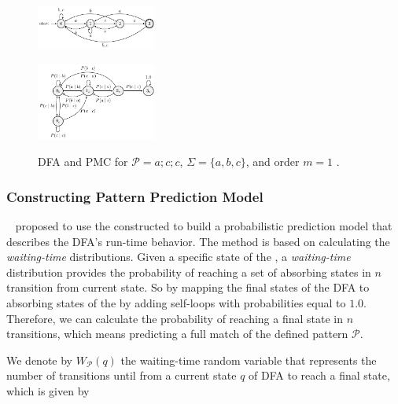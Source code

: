 \begin{figure}[!ht]
\begin{centering}

\includegraphics[width=0.35\textwidth]{./chapters/figures/forecasting/dfasr.pdf}
\label{fig:dfatcc}

\hfill

\includegraphics[width=0.35\textwidth]{./chapters/figures/forecasting/pmcr1.pdf}
\label{fig:mctcc1}

\caption{DFA and PMC for $\mathcal{P}=a ; c ; c$,  $\Sigma=\{a,b,c\}$, and order $m=1$  \cite{alevizos2017event}.}
\label{fig:dfa_mc_example}
\end{centering}
\end{figure}

\subsubsection*{Constructing Pattern Prediction Model}
\label{sec:pmc_prediction}

~\citet{alevizos2017event} proposed to use the constructed \pmcmr to build a probabilistic prediction model that describes the DFA's run-time behavior. The method is based on calculating the \textit{waiting-time} distributions. Given a specific state of the \pmcmr, a \textit{waiting-time} distribution provides the probability of reaching a set of absorbing states in $n$ transition from current state. So by mapping the final states of the DFA to absorbing states of the \pmcmr by adding self-loops with probabilities equal to $1.0$. Therefore, we can calculate the probability of reaching a final state in $n$ transitions,  which means predicting a full match of the defined pattern $\mathcal{P}$.

\par We denote by $W_{\mathcal{P}}(q)$  the waiting-time random variable that represents the
number of transitions until from a current state $q$ of DFA to reach a final state\cite{alevizos2017event}, which is given by 

